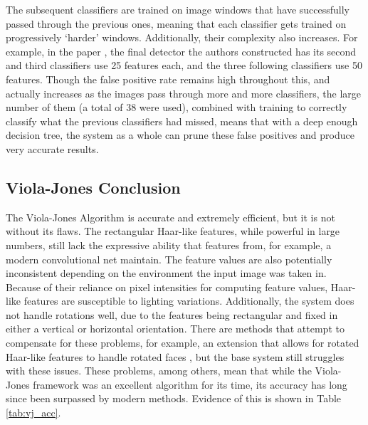\documentclass[11pt,a4paper,oldfontcommands]{memoir}
\begin{document}
The subsequent classifiers are trained on image windows that have successfully passed through the previous ones, meaning that each classifier gets trained on progressively `harder' windows. Additionally, their complexity also increases. For example, in the paper \cite{viola_updated}, the final detector the authors constructed has its second and third classifiers use 25 features each, and the three following classifiers use 50 features. Though the false positive rate remains high throughout this, and actually increases as the images pass through more and more classifiers, the large number of them (a total of 38 were used), combined with training to correctly classify what the previous classifiers had missed, means that with a deep enough decision tree, the system as a whole can prune these false positives and produce very accurate results. 

\subsection{Viola-Jones Conclusion}
The Viola-Jones Algorithm is accurate and extremely efficient, but it is not without its flaws. The rectangular Haar-like features, while powerful in large numbers, still lack the expressive ability that features from, for example, a modern convolutional net maintain. The feature values are also potentially inconsistent depending on the environment the input image was taken in. Because of their reliance on pixel intensities for computing feature values, Haar-like features are susceptible to lighting variations. Additionally, the system does not handle rotations well, due to the features being rectangular and fixed in either a vertical or horizontal orientation. There are methods that attempt to compensate for these problems, for example, an extension that allows for rotated Haar-like features to handle rotated faces \cite{Rotated_Haar}, but the base system still struggles with these issues. These problems, among others, mean that while the Viola-Jones framework was an excellent algorithm for its time, its accuracy has long since been surpassed by modern methods. Evidence of this is shown in Table \ref{tab:vj_acc}.
\end{document}
